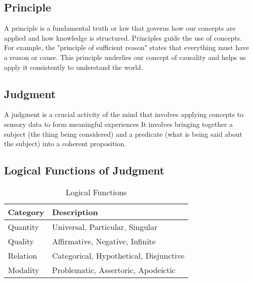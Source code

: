 \documentclass[a4paper]{article}
\begin{document}
\subsection{Principle}
A principle is a fundamental truth or law that governs how our concepts are applied and how knowledge is structured. 
Principles guide the use of concepts. 
For example, the "principle of sufficient reason" states that everything must have a reason or cause. 
This principle underlies our concept of causality and helps us apply it consistently to understand the world.

\subsection{Judgment}
A judgment is a crucial activity of the mind that involves applying concepts to sensory data to form meaningful experiences
It involves bringing together a subject (the thing being considered) and a predicate (what is being said about the subject) into a coherent proposition.


\subsection{Logical Functions of Judgment}

\begin{table}[h!]
    \centering
    \begin{tabular}{|p{2cm}|p{10cm}|}
    \hline
    \textbf{Category} & \textbf{Description} \\
    \hline
    Quantity & Universal, Particular, Singular \\
    \hline
    Quality & Affirmative, Negative, Infinite \\
    \hline
    Relation & Categorical, Hypothetical, Disjunctive \\
    \hline
    Modality & Problematic, Assertoric, Apodeictic \\
    \hline
    \end{tabular}
    \caption{Logical Functions}
    \label{tab:categories}
    \end{table}
\end{document}
